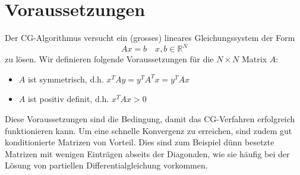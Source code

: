 \section{Voraussetzungen\label{cg:section:voraussetzungen}}

Der CG-Algorithmus versucht ein (grosses) lineares Gleichungssystem der Form
\begin{equation}
Ax = b \quad x, b \in \mathbb{R}^N
\end{equation}
zu lösen.
Wir definieren folgende Voraussetzungen für die $N\times N$ Matrix $A$:
\begin{itemize}
	\item $A$ ist symmetrisch, d.h. $x^T A y = y^T A^T x = y^T A x$
	\item $A$ ist positiv definit, d.h. $x^T A x > 0$
\end{itemize}
Diese Voraussetzungen sind die Bedingung, damit das CG-Verfahren erfolgreich funktionieren kann.
Um eine schnelle Konvergenz zu erreichen, sind zudem gut konditionierte Matrizen von Vorteil.
Dies sind zum Beispiel dünn besetzte Matrizen mit wenigen Einträgen abseits der Diagonalen, wie sie häufig bei der Lösung von partiellen Differentialgleichung vorkommen.